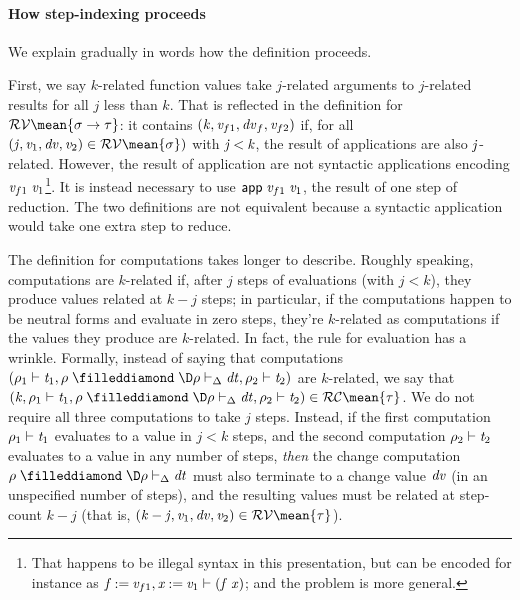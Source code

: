 \paragraph{How step-indexing proceeds}
We explain gradually in words how the definition proceeds.

First, we say $k$-related function values take $j$-related arguments to $j$-related
results for all $j$ less than $k$. That is reflected in the definition for
\ensuremath{\mathcal{RV}\mean{\sigma\to \tau}}: it contains \ensuremath{(\Varid{k},\Varid{v}_{f1},\Varid{dv}_f,\Varid{v}_{f2})} if, for all
\ensuremath{(\Varid{j},\Varid{v}_{1},\Varid{dv},\Varid{v}_{2})\in \mathcal{RV}\mean{\sigma})} with \ensuremath{\Varid{j}\mathbin{<}\Varid{k}}, the result of
applications are also \ensuremath{\Varid{j}}-related.
However, the result of application are not syntactic applications encoding \ensuremath{\Varid{v}_{f1}\;\Varid{v}_{1}}\footnote{That happens to be illegal syntax in this presentation, but can be
encoded for instance as \ensuremath{\Varid{f}\mathbin{:=}\Varid{v}_{f1},\Varid{x}\mathbin{:=}\Varid{v}_{1}\vdash(\Varid{f}\;\Varid{x})}; and the problem is
more general.}.
It is instead necessary to use \ensuremath{\mathsf{app}\;\Varid{v}_{f1}\;\Varid{v}_{1}}, the result of one step of
reduction. The two definitions are not equivalent because a syntactic
application would take one extra step to reduce.

The definition for computations takes longer to describe. Roughly speaking, computations are $k$-related if, after $j$
steps of evaluations (with $j < k$), they produce values related at $k - j$
steps; in particular, if the computations happen to be neutral forms and
evaluate in zero steps, they're $k$-related as computations if the values they
produce are $k$-related.
In fact, the rule for evaluation has a wrinkle.
Formally, instead of saying that computations \ensuremath{(\rho_{1}\vdash\Varid{t}_{1},\rho\mathrel{\filleddiamond}\D\rho\vdash_{\Delta}\Varid{dt},\rho_{2}\vdash\Varid{t}_{2})} are $k$-related, we say that \ensuremath{(\Varid{k},\rho_{1}\vdash\Varid{t}_{1},\rho\mathrel{\filleddiamond}\D\rho\vdash_{\Delta}\Varid{dt},\rho_{2}\vdash\Varid{t}_{2})\in \mathcal{RC}\mean{\tau}}. We do not require
all three computations to take $j$ steps. Instead, if the first computation
\ensuremath{\rho_{1}\vdash\Varid{t}_{1}} evaluates to a value in $j < k$ steps, and the second
computation \ensuremath{\rho_{2}\vdash\Varid{t}_{2}} evaluates to a value in any number of steps,
\emph{then} the change computation \ensuremath{\rho\mathrel{\filleddiamond}\D\rho\vdash_{\Delta}\Varid{dt}} must also terminate to
a change value \ensuremath{\Varid{dv}} (in an unspecified number of steps), and the resulting
values must be related at step-count $k-j$ (that is,
\ensuremath{(\Varid{k}\mathbin{-}\Varid{j},\Varid{v}_{1},\Varid{dv},\Varid{v}_{2})\in \mathcal{RV}\mean{\tau}}).

